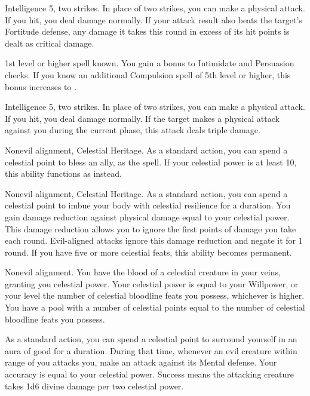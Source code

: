 \featpre Intelligence 5, two strikes.
\featben In place of two strikes, you can make a physical attack.
If you hit, you deal damage normally.
If your attack result also beats the target's Fortitude defense, any damage it takes this round in excess of its hit points is dealt as critical damage.

\featpre 1st level or higher  spell known.
\featben You gain a  bonus to Intimidate and Persuasion checks.
If you know an additional Compulsion spell of 5th level or higher, this bonus increases to .

\featpres Intelligence 5, two strikes.
\featben In place of two strikes, you can make a physical attack.
If you hit, you deal damage normally.
If the target makes a physical attack against you during the current phase, this attack deals triple damage.

\featpres Nonevil alignment, Celestial Heritage.
\featben As a standard action, you can spend a celestial point to bless an ally, as the  spell.
If your celestial power is at least 10, this ability functions as  instead.

\featpres Nonevil alignment, Celestial Heritage.
\featben As a standard action, you can spend a celestial point to imbue your body with celestial resilience for a \durshort duration.
You gain damage reduction against physical damage equal to your celestial power.
This damage reduction allows you to ignore the first points of damage you take each round.
Evil-aligned attacks ignore this damage reduction and negate it for 1 round.
If you have five or more celestial feats, this ability becomes permanent.

\featpre Nonevil alignment.
\featben You have the blood of a celestial creature in your veins, granting you celestial power.
Your celestial power is equal to your Willpower, or your level \add the number of celestial bloodline feats you possess, whichever is higher.
You have a pool with a number of celestial points equal to the number of celestial bloodline feats you possess.

As a standard action, you can spend a celestial point to surround yourself in an aura of good for a \durshort duration.
During that time, whenever an evil creature within \rngclose range of you attacks you, make an attack against its Mental defense.
Your accuracy is equal to your celestial power.
Success means the attacking creature takes 1d6 divine damage per two celestial power.

